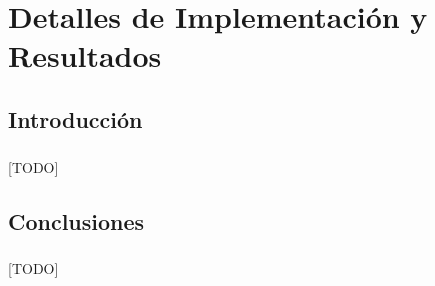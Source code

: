 \documentclass{subfiles}
\begin{document}
  \chapter{Detalles de Implementación y Resultados}
  \label{chap:implementation}

    \section{Introducción}
    \label{sec:implementation_intro}

      \paragraph{}
      [TODO]

    \section{Conclusiones}
    \label{sec:implementation_conclusions}

      \paragraph{}
      [TODO]
\end{document}
